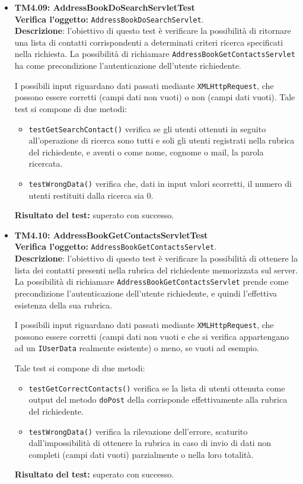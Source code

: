 \begin{itemize}
\item \textbf{TM4.09: AddressBookDoSearchServletTest}\\
\textbf{Verifica l'oggetto:} \texttt{AddressBookDoSearchServlet}.\\
\textbf{Descrizione}: l'obiettivo di questo test è verificare la possibilità di ritornare una lista di contatti corrispondenti a determinati criteri ricerca specificati nella richiesta. La possibilità di richiamare \texttt{AddressBookGetContactsServlet} ha come precondizione l'autenticazione dell'utente richiedente.

I possibili input riguardano dati passati mediante \texttt{XMLHttpRequest}, che possono essere corretti (campi dati non vuoti) o non (campi dati vuoti).
Tale test si compone di due metodi:
\begin{itemize}
\item \texttt{testGetSearchContact()} verifica se gli utenti ottenuti in seguito all'operazione di ricerca sono tutti e soli gli utenti registrati nella rubrica del richiedente, e aventi o come nome, cognome o mail, la parola ricercata.
\item \texttt{testWrongData()} verifica che, dati in input valori scorretti, il numero di utenti restituiti dalla ricerca sia 0.
\end{itemize}
\textbf{Risultato del test:} superato con successo.

\item \textbf{TM4.10: AddressBookGetContactsServletTest}\\
\textbf{Verifica l'oggetto:} \texttt{AddressBookGetContactsServlet}.\\
\textbf{Descrizione}: l'obiettivo di questo test è verificare la possibilità di ottenere la lista dei contatti presenti nella rubrica del richiedente memorizzata sul server. La possibilità di richiamare \texttt{AddressBookGetContactsServlet} prende come precondizione l'autenticazione dell'utente richiedente, e quindi l'effettiva esistenza della sua rubrica.

I possibili input riguardano dati passati mediante \texttt{XMLHttpRequest}, che possono essere corretti (campi dati non vuoti e che si verifica appartengano ad un \texttt{IUserData} realmente esistente) o meno, se vuoti ad esempio.

Tale test si compone di due metodi:
\begin{itemize}
\item \texttt{testGetCorrectContacts()} verifica se la lista di utenti ottenuta come output del metodo \texttt{doPost} della  corrisponde effettivamente alla rubrica del richiedente.
\item \texttt{testWrongData()} verifica la rilevazione dell'errore, scaturito dall'impossibilità di ottenere la rubrica in caso di invio di dati non completi (campi dati vuoti) parzialmente o nella loro totalità.
\end{itemize}
\textbf{Risultato del test:} superato con successo.


\end{itemize}
